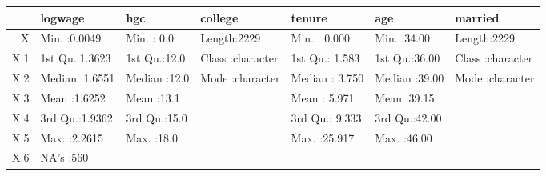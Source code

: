 \documentclass[12pt]{article}
\begin{document}
\begin{table}[ht]
\centering
\begin{tabular}{rllllll}
  \hline
 &    logwage &      hgc &   college &     tenure &      age &   married \\ 
  \hline
X & Min.   :0.0049   & Min.   : 0.0   & Length:2229        & Min.   : 0.000   & Min.   :34.00   & Length:2229        \\ 
  X.1 & 1st Qu.:1.3623   & 1st Qu.:12.0   & Class :character   & 1st Qu.: 1.583   & 1st Qu.:36.00   & Class :character   \\ 
  X.2 & Median :1.6551   & Median :12.0   & Mode  :character   & Median : 3.750   & Median :39.00   & Mode  :character   \\ 
  X.3 & Mean   :1.6252   & Mean   :13.1   &  & Mean   : 5.971   & Mean   :39.15   &  \\ 
  X.4 & 3rd Qu.:1.9362   & 3rd Qu.:15.0   &  & 3rd Qu.: 9.333   & 3rd Qu.:42.00   &  \\ 
  X.5 & Max.   :2.2615   & Max.   :18.0   &  & Max.   :25.917   & Max.   :46.00   &  \\ 
  X.6 & NA's   :560   &  &  &  &  &  \\ 
   \hline
\end{tabular}
\end{table}
 
\end{document}
